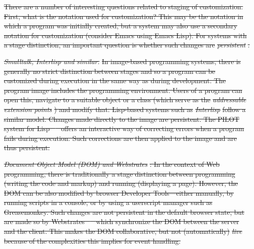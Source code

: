 \documentclass[english,submission]{programming}
\providecommand{\DIFdel}[1]{{\protect\color{red}\sout{#1}}}                      %
\begin{document}
\DIFdel{There are a number of interesting questions related to staging of
customization. First, what is the notation used for customization? This
may be the notation in which a program was initially created, but a
system may also use a secondary notation for customization (consider
Emacs using Emacs Lisp). For systems with a stage distinction, an
important question is whether such changes are }\emph{\DIFdel{persistent}}%
\DIFdel{.
}%

\emph{\DIFdel{Smalltalk, Interlisp and similar.}} %
\DIFdel{In image-based programming
systems, there is generally no strict distinction between stages and so
a program can be customized during execution in the same way as during
development. The program image includes the programming environment.
Users of a program can open this, navigate to a suitable object or a
class (which serve as the }\emph{\DIFdel{addressable extension points}}%
\DIFdel{) and
modify that. Lisp-based systems such as }\emph{\DIFdel{Interlisp}} %
\DIFdel{follow a
similar model. Changes made directly to the image are persistent. The
PILOT system for Lisp \mbox{%
\cite{Pilot} }\hspace{0pt}%
offers an interactive way of
correcting errors when a program fails during execution. Such
corrections are then applied to the image and are thus persistent.
}%

\emph{\DIFdel{Document Object Model (DOM) and Webstrates}}%
\DIFdel{: In the context of Web
programming, there is traditionally a stage distinction between
programming (writing the code and markup) and running (displaying a
page). However, the DOM can be also modified by browser Developer
Tools---either manually, by running scripts in a console, or by using a
userscript manager such as Greasemonkey. Such changes are not persistent
in the default browser state, but are made so by Webstrates
\mbox{%
\cite{Webstrates} }\hspace{0pt}%
which synchronize the DOM between the server and the
client. This makes the DOM collaborative, but not (automatically)
}\emph{\DIFdel{live}} %
\DIFdel{because of the complexities this implies for event handling.
}%

\end{document}

